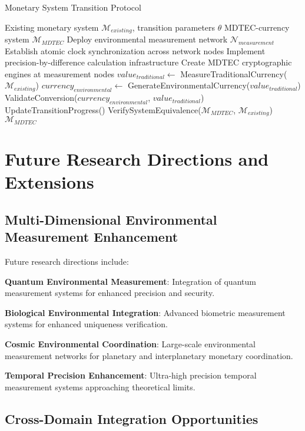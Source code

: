 \documentclass[12pt,a4paper]{article}
\begin{document}
\begin{algorithm}
\caption{Monetary System Transition Protocol}
\begin{algorithmic}[1]
\Require Existing monetary system $\mathcal{M}_{existing}$, transition parameters $\theta$
\Ensure MDTEC-currency system $\mathcal{M}_{MDTEC}$
\State Deploy environmental measurement network $\mathcal{N}_{measurement}$
\State Establish atomic clock synchronization across network nodes
\State Implement precision-by-difference calculation infrastructure
\State Create MDTEC cryptographic engines at measurement nodes
    \State $value_{traditional} \leftarrow$ MeasureTraditionalCurrency($\mathcal{M}_{existing}$)
    \State $currency_{environmental} \leftarrow$ GenerateEnvironmentalCurrency($value_{traditional}$)
    \State ValidateConversion($currency_{environmental}$, $value_{traditional}$)
    \State UpdateTransitionProgress()
\EndWhile
\State VerifySystemEquivalence($\mathcal{M}_{MDTEC}$, $\mathcal{M}_{existing}$)
\Return $\mathcal{M}_{MDTEC}$
\end{algorithmic}
\end{algorithm}

\section{Future Research Directions and Extensions}

\subsection{Multi-Dimensional Environmental Measurement Enhancement}

Future research directions include:

\textbf{Quantum Environmental Measurement}: Integration of quantum measurement systems for enhanced precision and security.

\textbf{Biological Environmental Integration}: Advanced biometric measurement systems for enhanced uniqueness verification.

\textbf{Cosmic Environmental Coordination}: Large-scale environmental measurement networks for planetary and interplanetary monetary coordination.

\textbf{Temporal Precision Enhancement}: Ultra-high precision temporal measurement systems approaching theoretical limits.

\subsection{Cross-Domain Integration Opportunities}
\end{document}
